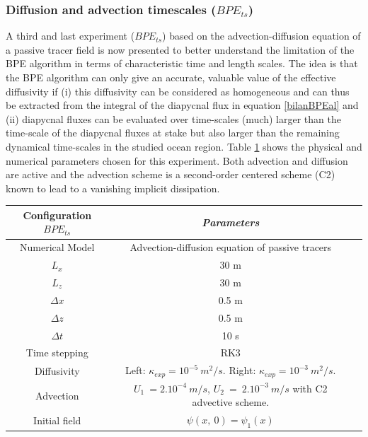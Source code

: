 \subsubsection{Diffusion and advection timescales ($BPE_{ts}$)}
A third and last experiment ($BPE_{ts}$) based on the advection-diffusion equation of a passive tracer field is now presented to better understand the limitation of the BPE algorithm in terms of characteristic time and length scales. The idea is that the BPE algorithm can only give an accurate, valuable value of the effective diffusivity if (i) this diffusivity can be considered as homogeneous and can thus be extracted from the integral of the diapycnal flux in equation \ref{bilanBPEal} and (ii) diapycnal fluxes can be evaluated over time-scales (much) larger than the time-scale of the diapycnal fluxes at stake but also larger than the remaining dynamical time-scales in the studied ocean region.
Table \ref{tab_NUMLAB_ts} shows the physical and numerical parameters chosen for this experiment. Both advection and diffusion are active and the advection scheme is a second-order centered scheme (C2) known to lead to a vanishing implicit dissipation.\\
\begin{table}[h]
        \centering
        \begin{tabular}{|c|c|c|}
                \hline
                Configuration $BPE_{ts}$ & \textit{Parameters}\\
                \hline 
                Numerical Model & Advection-diffusion equation of passive tracers\\
                $L_x$ & 30 m\\
                $L_z$ & 30 m\\
                $\Delta x$ & 0.5 m\\
                $\Delta z$ & 0.5 m\\
                $\Delta t$ & 10 s\\
                Time stepping & RK3 \\
                Diffusivity & Left: $\kappa_{exp} = 10^{-5} \ m^2/s$. Right: $\kappa_{exp} = 10^{-3} \ m^2/s$.\\
                Advection & $U_1\ = 2.10^{-4}\ m/s$, $U_2\ =\ 2.10^{-3}\ m/s$ with C2 advective scheme.\\
                Initial field & $\psi(x,\ 0)=\psi_1(x)$\\
                \hline
        \end{tabular}
        \label{tab_NUMLAB_ts}
\end{table}
